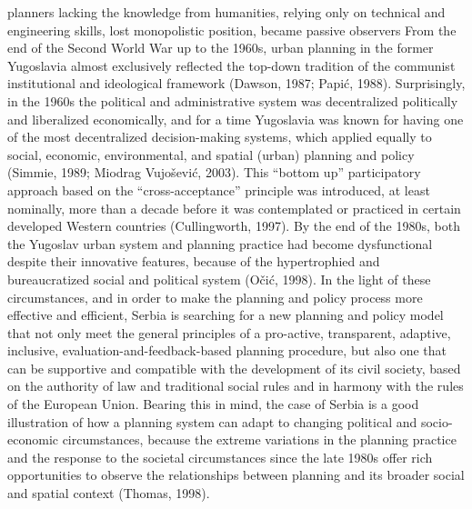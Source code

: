 \documentclass[11pt]{report}
\begin{document}
planners lacking the knowledge from humanities, relying only on technical and engineering skills, lost monopolistic position, became passive observers
From the end of the Second World War up to the 1960s, urban planning in the former Yugoslavia almost exclusively reflected the top-down tradition of the communist institutional and ideological framework (Dawson, 1987; Papić, 1988). Surprisingly, in the 1960s the political and administrative system was decentralized politically and liberalized economically, and for a time Yugoslavia was known for having one of the most decentralized decision-making systems, which applied equally to social, economic, environmental, and spatial (urban) planning and policy (Simmie, 1989; Miodrag Vujošević, 2003). This “bottom up” participatory approach based on the “cross-acceptance” principle was introduced, at least nominally, more than a decade before it was contemplated or practiced in certain developed Western countries (Cullingworth, 1997). By the end of the 1980s, both the Yugoslav urban system and planning practice had become dysfunctional despite their innovative features, because of the hypertrophied and bureaucratized social and political system (Očić, 1998).
In the light of these circumstances, and in order to make the planning and policy process more effective and efficient, Serbia is searching for a new planning and policy model that not only meet the general principles of a pro-active, transparent, adaptive, inclusive, evaluation-and-feedback-based planning procedure, but also one that can be supportive and compatible with the development of its civil society, based on the authority of law and traditional social rules and in harmony with the rules of the European Union.
Bearing this in mind, the case of Serbia is a good illustration of how a planning system can adapt to changing political and socio-economic circumstances, because the extreme variations in the planning practice and the response to the societal circumstances since the late 1980s offer rich opportunities to observe the relationships between planning and its broader social and spatial context (Thomas, 1998).
\end{document}
